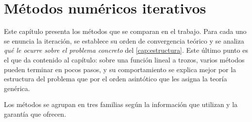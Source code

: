 \chapter{Métodos numéricos iterativos}
\label{cap:metodos}

Este capítulo presenta los \datoNMetodos{} métodos que se comparan en el trabajo.
Para cada uno se enuncia la iteración, se establece su orden de convergencia
teórico y se analiza \emph{qué le ocurre sobre el problema concreto} del \cref{cap:estructura}. Este último punto es el que da contenido al capítulo: sobre
una función lineal a trozos, varios métodos pueden terminar en pocos pasos, y
su comportamiento se explica mejor por la estructura del problema que por el
orden asintótico que les asigna la teoría genérica.

Los métodos se agrupan en tres familias según la información que utilizan y la
garantía que ofrecen.

